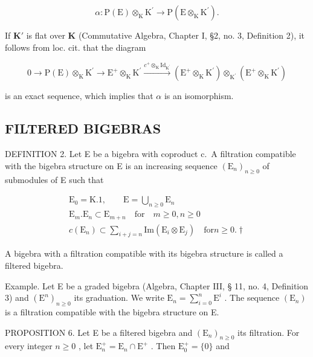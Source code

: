 \[
\alpha \colon \mathrm{P} (\mathrm{E}) \otimes_ {\mathrm{K}} \mathrm{K} ^ {\prime} \rightarrow \mathrm{P} (\mathrm{E} \otimes_ {\mathrm{K}} \mathrm{K} ^ {\prime}).
\]

If \(\mathbf{K}'\) is flat over \(\mathbf{K}\) (Commutative Algebra, Chapter I, §2, no. 3, Definition 2), it follows from loc. cit. that the diagram

\[
0 \longrightarrow \mathrm{P} (\mathrm{E}) \otimes_ {\mathrm{K}} \mathrm{K} ^ {\prime} \longrightarrow \mathrm{E} ^ {+} \otimes_ {\mathrm{K}} \mathrm{K} ^ {\prime} \xrightarrow {c ^ {+} \otimes_ {\mathrm{K}} \mathrm{Id} _ {\mathrm{K} ^ {\prime}}} \left(\mathrm{E} ^ {+} \otimes_ {\mathrm{K}} \mathrm{K} ^ {\prime}\right) \otimes_ {\mathrm{K} ^ {\prime}} \left(\mathrm{E} ^ {+} \otimes_ {\mathrm{K}} \mathrm{K} ^ {\prime}\right)
\]

is an exact sequence, which implies that \(\alpha\) is an isomorphism.

\subsection{FILTERED BIGEBRAS}

DEFINITION 2. Let E be a bigebra with coproduct c.~A filtration compatible with the bigebra structure on E is an increasing sequence \((\mathrm{E}_{n})_{n\geq0}\) of submodules of E such that

\[
\begin{array}{c} \mathrm{E} _ {0} = \mathrm{K}. 1, \qquad \mathrm{E} = \bigcup_ {n \geqslant 0} \mathrm{E} _ {n} \\ \mathrm{E} _ {m}. \mathrm{E} _ {n} \subset \mathrm{E} _ {m + n} \quad \text {for} \quad m \geqslant 0, n \geqslant 0 \\ c (\mathrm{E} _ {n}) \subset \sum_ {i + j = n} \mathrm{Im} (\mathrm{E} _ {i} \otimes \mathrm{E} _ {j}) \quad \text {for} n \geqslant 0. \dagger \end{array}\tag{6}
\]

A bigebra with a filtration compatible with its bigebra structure is called a filtered bigebra.

Example. Let E be a graded bigebra (Algebra, Chapter III, § 11, no. 4, Definition 3) and \((\mathrm{E}^n)_{n\geqslant 0}\) its graduation. We write \(\mathrm{E}_n = \sum_{i = 0}^{n}\mathrm{E}^i\) . The sequence \((\mathrm{E}_n)\) is a filtration compatible with the bigebra structure on E.

PROPOSITION 6. Let E be a filtered bigebra and \((\mathrm{E}_n)_{n\geqslant 0}\) its filtration. For every integer \(n\geqslant 0\) , let \(\mathrm{E}_n^+ = \mathrm{E}_n\cap \mathrm{E}^+\) . Then \(\mathrm{E_0^+} = \{0\}\) and

